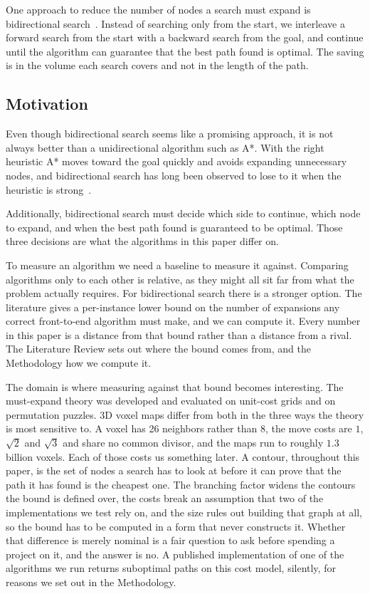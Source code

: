 \documentclass[letterpaper]{article} %
\begin{document}
One approach to reduce the number of nodes a search must expand is bidirectional search~\cite{pohl1971bidirectional}. Instead of searching only from the start, we interleave a forward search from the start with a backward search from the goal, and continue until the algorithm can guarantee that the best path found is optimal. The saving is in the volume each search covers and not in the length of the path.

\subsection{Motivation}

Even though bidirectional search seems like a promising approach, it is not always better than a unidirectional algorithm such as A*. With the right heuristic A* moves toward the goal quickly and avoids expanding unnecessary nodes, and bidirectional search has long been observed to lose to it when the heuristic is strong~\cite{barker2015limitations}.

Additionally, bidirectional search must decide which side to continue, which node to expand, and when the best path found is guaranteed to be optimal. Those three decisions are what the algorithms in this paper differ on.

To measure an algorithm we need a baseline to measure it against. Comparing algorithms only to each other is relative, as they might all sit far from what the problem actually requires. For bidirectional search there is a stronger option. The literature gives a per-instance lower bound on the number of expansions any correct front-to-end algorithm must make, and we can compute it. Every number in this paper is a distance from that bound rather than a distance from a rival. The Literature Review sets out where the bound comes from, and the Methodology how we compute it.

The domain is where measuring against that bound becomes interesting. The must-expand theory was developed and evaluated on unit-cost grids and on permutation puzzles. 3D voxel maps differ from both in the three ways the theory is most sensitive to. A voxel has 26 neighbors rather than 8, the move costs are $1$, $\sqrt{2}$ and $\sqrt{3}$ and share no common divisor, and the maps run to roughly $1.3$ billion voxels. Each of those costs us something later. A contour, throughout this paper, is the set of nodes a search has to look at before it can prove that the path it has found is the cheapest one. The branching factor widens the contours the bound is defined over, the costs break an assumption that two of the implementations we test rely on, and the size rules out building that graph at all, so the bound has to be computed in a form that never constructs it. Whether that difference is merely nominal is a fair question to ask before spending a project on it, and the answer is no. A published implementation of one of the algorithms we run returns suboptimal paths on this cost model, silently, for reasons we set out in the Methodology.
\end{document}
